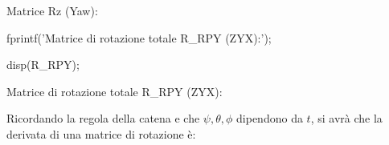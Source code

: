 \documentclass[11pt, a4paper]{article}
\begin{document}
\begin{matlaboutput}
Matrice Rz (Yaw):
\end{matlaboutput}
\begin{matlabcode}

fprintf('Matrice di rotazione totale R_RPY (ZYX):');

disp(R_RPY);
\end{matlabcode}
\begin{matlaboutput}
Matrice di rotazione totale R_RPY (ZYX):
\end{matlaboutput}
\begin{matlabsymbolicoutput}
\resizebox{\ifdim\width>\linewidth\linewidth\else\width\fi}{!}{%
$\displaystyle \begin{pmatrix}
    \cos \left(\phi \right)\,\cos \left(\theta \right) & \cos \left(\phi \right)\,\sin \left(\psi \right)\,\sin \left(\theta \right)-\cos \left(\psi \right)\,\sin \left(\phi \right) & \sin \left(\phi \right)\,\sin \left(\psi \right)+\cos \left(\phi \right)\,\cos \left(\psi \right)\,\sin \left(\theta \right)\\
    \cos \left(\theta \right)\,\sin \left(\phi \right) & \cos \left(\phi \right)\,\cos \left(\psi \right)+\sin \left(\phi \right)\,\sin \left(\psi \right)\,\sin \left(\theta \right) & \cos \left(\psi \right)\,\sin \left(\phi \right)\,\sin \left(\theta \right)-\cos \left(\phi \right)\,\sin \left(\psi \right)\\
    -\sin \left(\theta \right) & \cos \left(\theta \right)\,\sin \left(\psi \right) & \cos \left(\psi \right)\,\cos \left(\theta \right)
\end{pmatrix}$%
}
\end{matlabsymbolicoutput}

\newpage
\begin{par}
\begin{flushleft}
Ricordando la regola della catena e che $\psi ,\theta ,\phi$ dipendono da $t$, si avrà che la derivata di una matrice di rotazione è:
\end{flushleft}
\end{par}
\end{document}
